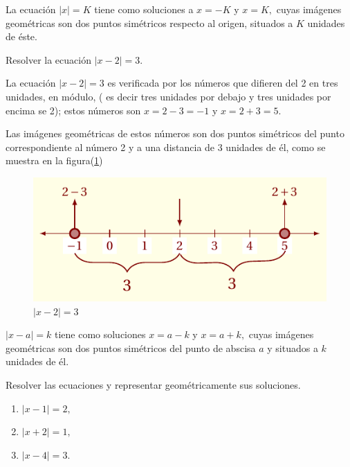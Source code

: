 \documentclass[oneside,english,spanish,2m,twoside,svgnames,x11names,HTML,twoside,12pt]{libro-matua}\usepackage[]{graphicx}\usepackage[]{color}
\newcommand{\val}[1]{\left|#1\right|}
\begin{document}
\general La ecuación $\val{x}=K$ tiene como soluciones a $x=-K$
y $x=K,$ cuyas imágenes geométricas son dos puntos simétricos respecto
al origen, situados a $K$ unidades de éste.

\begin{ejemplo}

Resolver la ecuación $\val{x-2}=3.$ 

\end{ejemplo}

\sol La ecuación $\val{x-2}=3$ es verificada por los números que
difieren del 2 en tres unidades, en módulo, ( es decir tres unidades
por debajo y tres unidades por encima se 2); estos números son $x=2-3=-1$
y $x=2+3=5.$

Las imágenes geométricas de estos números son dos puntos simétricos
del punto correspondiente al número 2 y a una distancia de 3 unidades
de él, como se muestra en la figura(\ref{fig:cal_lim2}) 

\begin{figure}[H]
\centering\includegraphics{3_home_antalcides_MEGA_calculo_I_libro_pdf_cal_lim2.pdf}\caption{$\val{x-2}=3$}\label{fig:cal_lim2}
\end{figure}
\fin

\general $\val{x-a}=k$ tiene como soluciones $x=a-k$ y $x=a+k,$
cuyas imágenes geométricas son dos puntos simétricos del punto de
abscisa $a$ y situados a $k$ unidades de él.\vspace*{10pt}

\begin{ejercicios}[]

Resolver las ecuaciones y representar geométricamente sus soluciones.
\begin{enumerate}
\item $\val{x-1}=2,$
\item $\val{x+2}=1,$
\item $\val{x-4}=3.$
\end{enumerate}
\end{ejercicios}
\end{document}
